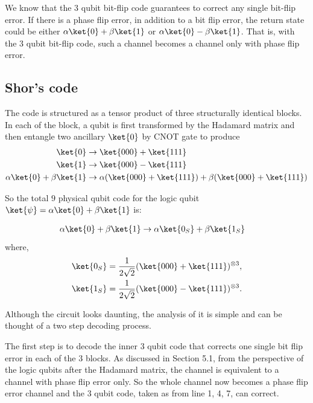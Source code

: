 We know that the \(3\) qubit bit-flip code guarantees to correct any single bit-flip error. If there is a phase flip error, in addition to a bit flip error, the return state could be either \(\alpha\ket{0} + \beta \ket{1}\) or \(\alpha\ket{0} - \beta \ket{1}\). That is, with the \(3\) qubit bit-flip code, such a channel becomes a channel only with phase flip error.


\subsection{Shor's code}
The code is structured as a tensor product of three structurally identical blocks. In each of the block, a qubit is first transformed by the Hadamard matrix and then entangle two ancillary \(\ket{0}\) by CNOT gate to produce 
\begin{align*}
    \ket{0} &\rightarrow \ket{000} + \ket{111}  \\
    \ket{1} &\rightarrow \ket{000} - \ket{111}  \\
    \alpha\ket{0} + \beta \ket{1} &\rightarrow \alpha(\ket{000} + \ket{111}) + \beta(\ket{000} + \ket{111})  
\end{align*}

So the total \(9\) physical qubit code for the logic qubit \(\ket{\psi} = \alpha\ket{0} + \beta \ket{1}\) is:

\begin{align}
   \alpha\ket{0} + \beta \ket{1} &\rightarrow \alpha \ket{0_S} + \beta \ket{1_S} \label{eq:ShorCode}
\end{align}
where, 
\begin{align*}
    \ket{0_S} &= \frac{1}{2\sqrt{2}}(\ket{000} + \ket{111})^{\otimes 3},\\
    \ket{1_S} &= \frac{1}{2\sqrt{2}}(\ket{000} - \ket{111})^{\otimes 3}.\\
\end{align*}

Although the circuit looks daunting, the analysis of it is simple and can be thought of a two step decoding process. 

The first step is to decode the inner \(3\) qubit code that corrects one single bit flip error in each of the \(3\) blocks. As discussed in Section 5.1, from the perspective of the logic qubits after the Hadamard matrix, the channel is equivalent to a channel with phase flip error only. 
So the whole channel now becomes a phase flip error channel and the 3 qubit code, taken as from line 1, 4, 7, can correct. 







